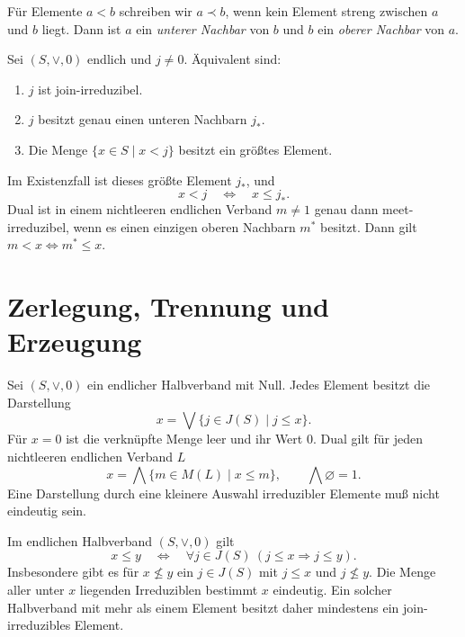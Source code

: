 \begin{definition}
Für Elemente $a<b$ schreiben wir $a\prec b$, wenn kein Element
streng zwischen $a$ und $b$ liegt. Dann ist $a$ ein
\emph{unterer Nachbar} von $b$ und $b$ ein \emph{oberer Nachbar} von $a$.
\end{definition}

\begin{theorem}
\label{b45guide:thm:cover}
Sei $(S,\vee,0)$ endlich und $j\ne0$. Äquivalent sind:
\begin{enumerate}
\item $j$ ist join-irreduzibel.
\item $j$ besitzt genau einen unteren Nachbarn $j_*$.
\item Die Menge $\{x\in S\mid x<j\}$ besitzt ein größtes Element.
\end{enumerate}
Im Existenzfall ist dieses größte Element $j_*$, und
\[
 x<j\quad\Longleftrightarrow\quad x\leq j_* .
\]
Dual ist in einem nichtleeren endlichen Verband $m\ne1$ genau
dann meet-irreduzibel, wenn es einen einzigen oberen Nachbarn
$m^*$ besitzt. Dann gilt $m<x\iff m^*\leq x$.
\cite{project,irreducible}
\end{theorem}

\section{Zerlegung, Trennung und Erzeugung}

\begin{theorem}
\label{b45guide:thm:decomposition}
Sei $(S,\vee,0)$ ein endlicher Halbverband mit Null.
Jedes Element besitzt die Darstellung
\[
 x=\bigvee\{j\in J(S)\mid j\leq x\}.
\]
Für $x=0$ ist die verknüpfte Menge leer und ihr Wert $0$.
Dual gilt für jeden nichtleeren endlichen Verband $L$
\[
 x=\bigwedge\{m\in M(L)\mid x\leq m\},
 \qquad \bigwedge\varnothing=1.
\]
Eine Darstellung durch eine kleinere Auswahl irreduzibler Elemente
muß nicht eindeutig sein. \cite{irreducible}
\end{theorem}

\begin{theorem}
\label{b45guide:thm:separation}
Im endlichen Halbverband $(S,\vee,0)$ gilt
\[
 x\leq y
 \quad\Longleftrightarrow\quad
 \forall j\in J(S)\ (j\leq x\Rightarrow j\leq y).
\]
Insbesondere gibt es für $x\not\leq y$ ein $j\in J(S)$
mit $j\leq x$ und $j\not\leq y$.
Die Menge aller unter $x$ liegenden Irreduziblen bestimmt $x$
eindeutig. Ein solcher Halbverband mit mehr als einem Element
besitzt daher mindestens ein join-irreduzibles Element. \cite{project}
\end{theorem}

